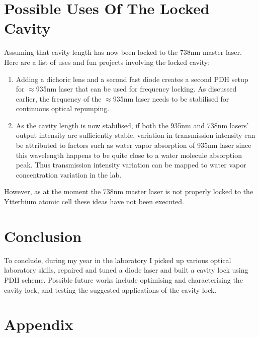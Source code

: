 \documentclass[12pt]{report}
\begin{document}
\section{Possible Uses Of The Locked Cavity}
Assuming that cavity length has now been locked to the 738nm master laser. Here are a list of uses and fun projects involving the locked cavity: 
\begin{enumerate}
    \item Adding a dichoric lens and a second fast diode creates a second PDH setup for $\approx$935nm laser that can be used for frequency locking. As discussed earlier, the frequency of the $\approx$935nm laser needs to be stabilised for continuous optical repumping.
    \item As the cavity length is now stabilised, if both the 935nm and 738nm lasers' output intensity are sufficiently stable, variation in transmission intensity can be attributed to factors such as water vapor absorption of 935nm laser since this wavelength happens to be quite close to a water molecule absorption peak. Thus transmission intensity variation can be mapped to water vapor concentration variation in the lab. 
\end{enumerate}

However, as at the moment the 738nm master laser is not properly locked to the Ytterbium atomic cell these ideas have not been executed.

\section{Conclusion}
To conclude, during my year in the laboratory I picked up various optical laboratory skills, repaired and tuned a diode laser and built a cavity lock using PDH scheme. Possible future works include optimising and characterising the cavity lock, and testing the suggested applications of the cavity lock. 

\section{Appendix}
\end{document}

